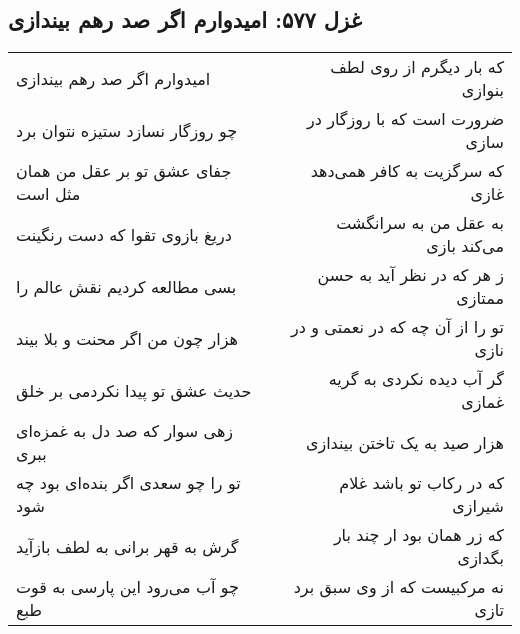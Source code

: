 \begin{center}
\section*{غزل ۵۷۷: امیدوارم اگر صد رهم بیندازی}
\label{sec:577}
\begin{longtable}{l p{0.5cm} r}
امیدوارم اگر صد رهم بیندازی
&&
که بار دیگرم از روی لطف بنوازی
\\
چو روزگار نسازد ستیزه نتوان برد
&&
ضرورت است که با روزگار در سازی
\\
جفای عشق تو بر عقل من همان مثل است
&&
که سرگزیت به کافر همی‌دهد غازی
\\
دریغ بازوی تقوا که دست رنگینت
&&
به عقل من به سرانگشت می‌کند بازی
\\
بسی مطالعه کردیم نقش عالم را
&&
ز هر که در نظر آید به حسن ممتازی
\\
هزار چون من اگر محنت و بلا بیند
&&
تو را از آن چه که در نعمتی و در نازی
\\
حدیث عشق تو پیدا نکردمی بر خلق
&&
گر آب دیده نکردی به گریه غمازی
\\
زهی سوار که صد دل به غمزه‌ای ببری
&&
هزار صید به یک تاختن بیندازی
\\
تو را چو سعدی اگر بنده‌ای بود چه شود
&&
که در رکاب تو باشد غلام شیرازی
\\
گرش به قهر برانی به لطف بازآید
&&
که زر همان بود ار چند بار بگدازی
\\
چو آب می‌رود این پارسی به قوت طبع
&&
نه مرکبیست که از وی سبق برد تازی
\\
\end{longtable}
\end{center}
